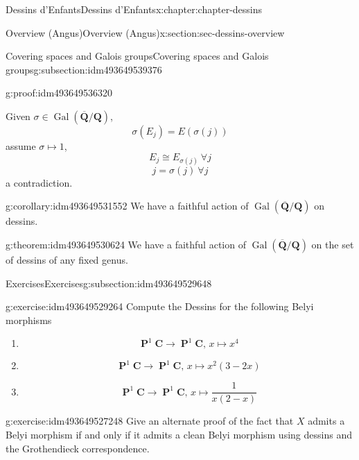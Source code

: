 \documentclass[oneside,10pt,]{book}
\numberwithin{equation}{section}
\newcommand{\QQ}{\mathbf{Q}}
\newcommand{\CC}{\mathbf{C}}
\newcommand{\absgal}[1]{\operatorname{Gal}(\overline{#1}/#1)}
\DeclareMathOperator{\PP}{\mathbf{P}}
\begin{document}
\begin{chapterptx}{Dessins d'Enfants}{}{Dessins d'Enfants}{}{}{x:chapter:chapter-dessins}
\begin{sectionptx}{Overview (Angus)}{}{Overview (Angus)}{}{}{x:section:sec-dessins-overview}
\begin{subsectionptx}{Covering spaces and Galois groups}{}{Covering spaces and Galois groups}{}{}{g:subsection:idm493649539376}
\begin{proofptx}{}{g:proof:idm493649536320}
\par
Given \(\sigma \in \absgal{\QQ}\),%
\begin{equation*}
\sigma(E_j) = E(\sigma(j))
\end{equation*}
assume \(\sigma \mapsto 1\),%
\begin{equation*}
E_j \cong E_{\sigma(j)}\ \forall j
\end{equation*}
%
\begin{equation*}
j = \sigma(j) \ \forall j
\end{equation*}
a contradiction.%
\end{proofptx}
\begin{corollary}{}{}{g:corollary:idm493649531552}%
We have a faithful action of \(\absgal{\QQ}\) on dessins.%
\end{corollary}
\begin{theorem}{}{}{g:theorem:idm493649530624}%
We have a faithful action of \(\absgal{\QQ}\) on the set of dessins of any fixed genus.%
\end{theorem}
\end{subsectionptx}
%
%
\typeout{************************************************}
\typeout{************************************************}
%
\begin{subsectionptx}{Exercises}{}{Exercises}{}{}{g:subsection:idm493649529648}
\begin{inlineexercise}{}{g:exercise:idm493649529264}%
Compute the Dessins for the following Belyi morphisms%
\begin{enumerate}
\item{}%
\begin{equation*}
\PP^1\CC\to \PP^1\CC,\,x\mapsto x^4
\end{equation*}
%
\item{}%
\begin{equation*}
\PP^1\CC\to \PP^1\CC,\,x\mapsto x^2(3-2x)
\end{equation*}
%
\item{}%
\begin{equation*}
\PP^1\CC\to \PP^1\CC,\,x\mapsto \frac{1}{x(2-x)}
\end{equation*}
%
\end{enumerate}
%
\end{inlineexercise}
\begin{inlineexercise}{}{g:exercise:idm493649527248}%
Give an alternate proof of the fact that \(X\) admits a Belyi morphism if and only if it admits a clean Belyi morphism using dessins and the Grothendieck correspondence.%

\end{inlineexercise}
\end{subsectionptx}
\end{sectionptx}
\end{chapterptx}
\end{document}
